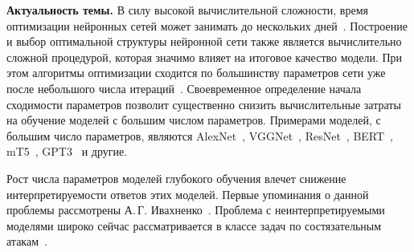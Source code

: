 \textbf{Актуальность темы.} В силу высокой вычислительной сложности, время оптимизации нейронных сетей может занимать до нескольких дней~\cite{sutskever2014}.
Построение и выбор оптимальной структуры нейронной сети также является вычислительно сложной процедурой, которая значимо влияет на итоговое качество модели. 
При этом алгоритмы оптимизации сходится по большинству параметров сети уже после небольшого числа итераций~\cite{Chunyan2016}.
Своевременное определение начала сходимости параметров позволит существенно снизить вычислительные затраты на обучение моделей с большим числом параметров.
Примерами моделей, с большим число параметров, являются AlexNet~\cite{Krizhevsky2012}, VGGNet~\cite{Simonyan2014}, ResNet~\cite{Kaiming2015}, BERT~\cite{Devlin2018, Vaswani2017}, mT5~\cite{Linting2021}, GPT3~\cite{Brown2020} и другие.

Рост числа параметров моделей глубокого обучения влечет снижение интерпретируемости ответов этих моделей.
Первые упоминания о данной проблемы рассмотрены А.\,Г. Ивахненко~\cite{Ivakhnenko1994}.
Проблема с неинтерпретируемыми моделями широко сейчас рассматривается в классе задач по состязательным атакам~\cite{Zheng2020}.

